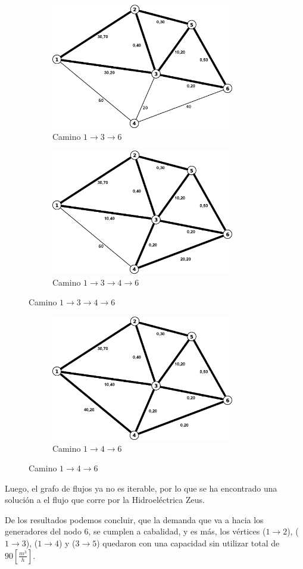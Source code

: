 \documentclass[12pt,letterpaper]{article}
\begin{document}
\begin{figure}[htbp]
        \begin{subfigure}[htbp]{8cm}
                \centering
                \includegraphics[width=8cm]{./it4.png}
                \caption{Camino $1\to3\to6$}
        \end{subfigure}
        \begin{subfigure}[htbp]{8cm}
                \centering
                \includegraphics[width=8cm]{./it5.png}
                \caption{Camino $1\to3\to4\to6$}
        \end{subfigure}
\end{figure}

\begin{figure}[htbp]
        \begin{subfigure}[htbp]{8cm}
                \centering
                \includegraphics[width=8cm]{./it6.png}
                \caption{Camino $1\to4\to6$}
        \end{subfigure}
\end{figure}
\newpage
Luego, el grafo de flujos ya no es iterable, por lo que se ha encontrado una solución a el flujo que corre por la Hidroeléctrica Zeus.

De los resultados podemos concluir, que la demanda que va a hacia los generadores del nodo 6, se cumplen a cabalidad, y es más, los vértices ($1\to2$), ($1\to3$), ($1\to4$) y ($3\to5$) quedaron con una capacidad sin utilizar total de $90 [\frac{m^3}{h}]$.
\end{document}
